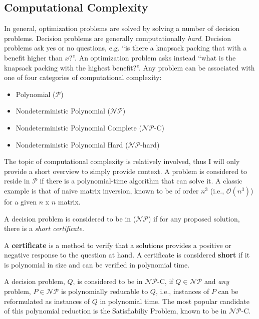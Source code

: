 \subsection{Computational Complexity}\label{sec:complexity}

In general, optimization problems are solved by solving a number of decision
problems. Decision problems are generally
computationally \textit{hard}. Decision problems ask yes or no questions,
e.g. ``is there a knapsack packing that with a benefit higher than $x$?''. An
optimization problem asks instead ``what is the knapsack packing with the
highest benefit?''. Any problem can be associated with one of four categories of
computational complexity:

\begin{itemize}
        \item Polynomial ($\mathcal{P}$)
        \item Nondeterministic Polynomial ($\mathcal{NP}$)
        \item Nondeterministic Polynomial Complete  ($\mathcal{NP}$-C)
        \item Nondeterministic Polynomial Hard  ($\mathcal{NP}$-hard)
\end{itemize}

The topic of computational complexity is relatively involved, thus I will only
provide a short overview to simply provide context. A problem is considered to
reside in $\mathcal{P}$ if there is a polynomial-time algorithm that can solve
it. A classic example is that of naive matrix inversion, known to be of order
$n^3$ (i.e., $\mathcal{O}(n^3)$) for a given $n$ x $n$ matrix.

A decision problem is considered to be in ($\mathcal{NP}$) if for any proposed
solution, there is a \textit{short certificate}.

\begin{define}
A \textbf{certificate} is a method to verify that a solutions provides a
positive or negative response to the question at hand. A certificate is
considered \textbf{short} if it is polynomial in size and can be verified in
polynomial time.
\end{define}

A decision problem, $Q$, is considered to be in $\mathcal{NP}$-C, if
$Q \in \mathcal{NP}$ and \textit{any} problem, $P \in \mathcal{NP}$ is
polynomially reducable to $Q$, i.e., instances of $P$ can be reformulated as
instances of $Q$ in polynomial time. The most popular candidate of this
polynomial reduction is the Satisfiabiliy Problem, known to be in
$\mathcal{NP}$-C.

